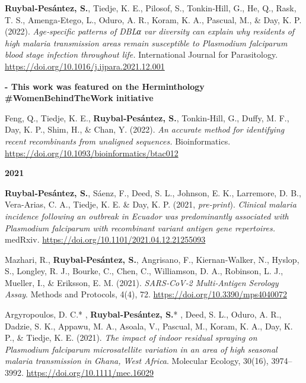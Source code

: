 \documentclass[11pt,a4paper,]{awesome-cv}
\begin{document}
\textbf{Ruybal‐Pesántez, S.}, Tiedje, K. E., Pilosof, S., Tonkin‐Hill,
G., He, Q., Rask, T. S., Amenga‐Etego, L., Oduro, A. R., Koram, K. A.,
Pascual, M., \& Day, K. P. (2022). \emph{Age‐specific patterns of DBLα
var diversity can explain why residents of high malaria transmission
areas remain susceptible to Plasmodium falciparum blood stage infection
throughout life.} International Journal for Parasitology.
\url{https://doi.org/10.1016/j.ijpara.2021.12.001}

\setlength{\leftskip}{2cm}

\textbf{- This work was featured on the Herminthology
\#WomenBehindTheWork initiative
\href{https://facebook.com/102760015458811/posts/151514423916703/?d=n}{\faExternalLink}}

Feng, Q., Tiedje, K. E., \textbf{Ruybal‐Pesántez, S.}, Tonkin‐Hill, G.,
Duffy, M. F., Day, K. P., Shim, H., \& Chan, Y. (2022). \emph{An
accurate method for identifying recent recombinants from unaligned
sequences.} Bioinformatics.
\url{https://doi.org/10.1093/bioinformatics/btac012}

\setlength{\leftskip}{0cm}

\textbf{2021}

\setlength{\leftskip}{1cm}

\textbf{Ruybal‐Pesántez, S.}, Sáenz, F., Deed, S. L., Johnson, E. K.,
Larremore, D. B., Vera-Arias, C. A., Tiedje, K. E. \& Day, K. P. (2021,
\emph{pre-print}). \emph{Clinical malaria incidence following an
outbreak in Ecuador was predominantly associated with Plasmodium
falciparum with recombinant variant antigen gene repertoires.} medRxiv.
\url{https://doi.org/10.1101/2021.04.12.21255093}

Mazhari, R., \textbf{Ruybal‐Pesántez, S.}, Angrisano, F.,
Kiernan‐Walker, N., Hyslop, S., Longley, R. J., Bourke, C., Chen, C.,
Williamson, D. A., Robinson, L. J., Mueller, I., \& Eriksson, E. M.
(2021). \emph{SARS‐CoV‐2 Multi‐Antigen Serology Assay}. Methods and
Protocols, 4(4), 72. \url{https://doi.org/10.3390/mps4040072}

Argyropoulos, D. C.* , \textbf{Ruybal‐Pesántez, S.}* , Deed, S. L.,
Oduro, A. R., Dadzie, S. K., Appawu, M. A., Asoala, V., Pascual, M.,
Koram, K. A., Day, K. P., \& Tiedje, K. E. (2021). \emph{The impact of
indoor residual spraying on Plasmodium falciparum microsatellite
variation in an area of high seasonal malaria transmission in Ghana,
West Africa}. Molecular Ecology, 30(16), 3974--3992.
\url{https://doi.org/10.1111/mec.16029}

\setlength{\leftskip}{2cm}
\end{document}
